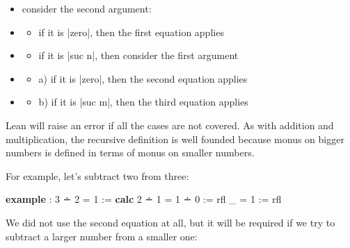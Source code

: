\documentclass{memoir}
\newcommand{\PLFASymbol}[1]{{\PLFASymbolFont #1}}
\begin{document}
\begin{itemize}
\item consider the second argument:
\item \begin{itemize}
\item if it is \LeanVerb|zero|, then the first equation applies

\end{itemize}

\item \begin{itemize}
\item if it is \LeanVerb|suc n|, then consider the first argument

\end{itemize}

\item \begin{itemize}
\item a) if it is \LeanVerb|zero|, then the second equation applies

\end{itemize}

\item \begin{itemize}
\item b) if it is \LeanVerb|suc m|, then the third equation applies

\end{itemize}

\par

\end{itemize}

\par
Lean will raise an error if all the cases are not covered. As with addition
and multiplication, the recursive definition is well founded because monus on
bigger numbers is defined in terms of monus on smaller numbers.

\par
For example, let's subtract two from three:

\par
\begin{LeanVerbatim}
\textbf{example} : 3 \PLFASymbol{∸} 2 = 1 :=
    \textbf{calc}
        2 \PLFASymbol{∸} 1
      = 1 \PLFASymbol{∸} 0 := rfl
    _ = 1     := rfl
\end{LeanVerbatim}

\par
We did not use the second equation at all, but it will be required if we try to
subtract a larger number from a smaller one:
\end{document}
